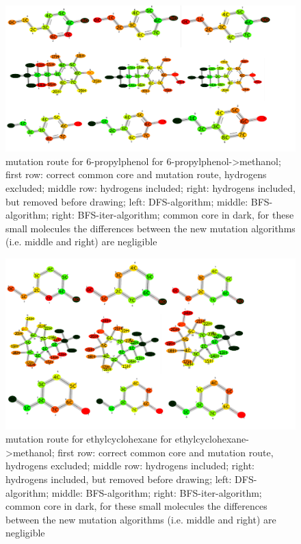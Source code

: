 \begin{figure}[H]
	
	\includegraphics[scale=0.75]{6propylphenol_set2}\caption{mutation route for 6-propylphenol for 6-propylphenol->methanol; first row: correct common core and mutation route, hydrogens excluded; middle row: hydrogens included; right: hydrogens included, but removed before drawing; left: DFS-algorithm; middle: BFS-algorithm; right: BFS-iter-algorithm; common core in dark, for these small molecules the differences between the new mutation algorithms (i.e. middle and right) are negligible}
	
\end{figure}

\begin{figure}[H]
	
	\includegraphics[scale=0.75]{ethylcyclohexane_set2}\caption{mutation route for ethylcyclohexane for ethylcyclohexane->methanol; first row: correct common core and mutation route, hydrogens excluded; middle row: hydrogens included; right: hydrogens included, but removed before drawing; left: DFS-algorithm; middle: BFS-algorithm; right: BFS-iter-algorithm; common core in dark, for these small molecules the differences between the new mutation algorithms (i.e. middle and right) are negligible}
	
\end{figure}

